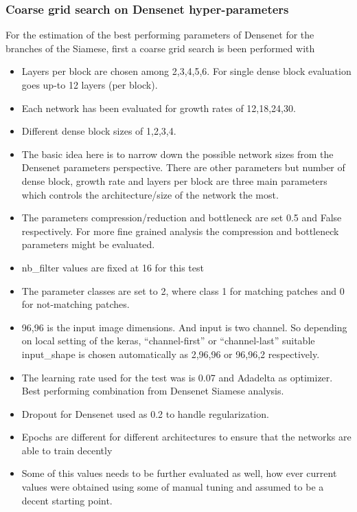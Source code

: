\subsubsection{Coarse grid search on Densenet hyper-parameters}
For the estimation of the best performing parameters of Densenet for the branches of the Siamese, first a coarse grid search is been performed with 
\begin{itemize}
 \item Layers per block are chosen among 2,3,4,5,6. For single dense block evaluation goes up-to 12 layers (per block). 
 \item Each network has been evaluated for growth rates of 12,18,24,30. %
 \item Different dense block sizes of 1,2,3,4.  
 \item The basic idea here is to narrow down the possible network sizes from the Densenet parameters perspective. There are other parameters but number of dense block, 
 growth rate and layers per block are three main parameters which controls the architecture/size of the network the most.
 \item The parameters compression/reduction and bottleneck are set 0.5 and False respectively. For more fine grained analysis the compression and bottleneck parameters might be evaluated. 
 \item nb\_filter values are fixed at 16 for this test
 \item The parameter classes are set to 2, where class 1 for matching patches and 0 for not-matching patches.
 \item 96,96 is the input image dimensions. And input is two channel. So depending on local setting of the keras, “channel-first” or “channel-last” suitable input\_shape is 
 chosen automatically as  2,96,96  or 96,96,2 respectively.
 \item The learning rate used for the test was is 0.07 and Adadelta as optimizer. Best performing combination from Densenet Siamese analysis.
 \item Dropout for Densenet used as 0.2 to handle regularization.
 \item Epochs are different for different architectures to ensure that the networks are able to train decently %
 \item Some of this values needs to be further evaluated as well, how ever current values were obtained using some of manual tuning and assumed to be a decent starting point.

\end{itemize}
